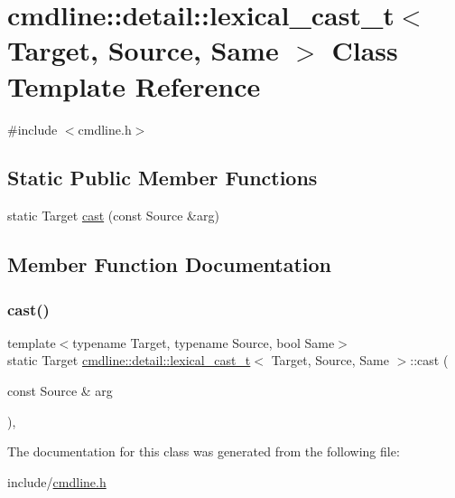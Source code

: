 \hypertarget{classcmdline_1_1detail_1_1lexical__cast__t}{}\section{cmdline\+::detail\+::lexical\+\_\+cast\+\_\+t$<$ Target, Source, Same $>$ Class Template Reference}
\label{classcmdline_1_1detail_1_1lexical__cast__t}


{\ttfamily \#include $<$cmdline.\+h$>$}

\subsection*{Static Public Member Functions}
\begin{DoxyCompactItemize}
\item 
static Target \mbox{\hyperlink{classcmdline_1_1detail_1_1lexical__cast__t_a533dd7d81255f684abba07d6c1545b1b}{cast}} (const Source \&arg)
\end{DoxyCompactItemize}


\subsection{Member Function Documentation}
\mbox{\label{classcmdline_1_1detail_1_1lexical__cast__t_a533dd7d81255f684abba07d6c1545b1b}} 
\subsubsection{\texorpdfstring{cast()}{cast()}}
{\footnotesize\ttfamily template$<$typename Target, typename Source, bool Same$>$ \\
static Target \mbox{\hyperlink{classcmdline_1_1detail_1_1lexical__cast__t}{cmdline\+::detail\+::lexical\+\_\+cast\+\_\+t}}$<$ Target, Source, Same $>$\+::cast (\begin{DoxyParamCaption}\item[{const Source \&}]{arg }\end{DoxyParamCaption})\hspace{0.3cm}{\ttfamily [inline]}, {\ttfamily [static]}}



The documentation for this class was generated from the following file\+:\begin{DoxyCompactItemize}
\item 
include/\mbox{\hyperlink{cmdline_8h}{cmdline.\+h}}\end{DoxyCompactItemize}
